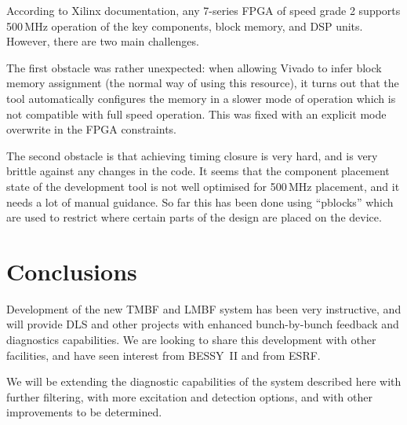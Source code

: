 \documentclass[
    a4paper,
    keeplastbox,            %
    hyphens,                %
    nospread,               %
]{jacow-2_1}
\begin{document}
According to Xilinx documentation, any 7-series FPGA of speed grade 2 supports
500\,MHz operation of the key components, block memory, and DSP units.  However,
there are two main challenges.

The first obstacle was rather unexpected: when allowing Vivado to infer block
memory assignment (the normal way of using this resource), it turns out that the
tool automatically configures the memory in a slower mode of operation which is
not compatible with full speed operation.  This was fixed with an explicit mode
overwrite in the FPGA constraints.

The second obstacle is that achieving timing closure is very hard, and is very
brittle against any changes in the code.  It seems that the component placement
state of the development tool is not well optimised for 500\,MHz placement, and
it needs a lot of manual guidance.  So far this has been done using ``pblocks''
which are used to restrict where certain parts of the design are placed on the
device.


\section{Conclusions}

Development of the new TMBF and LMBF system has been very instructive, and will
provide DLS and other projects with enhanced bunch-by-bunch feedback and
diagnostics capabilities.  We are looking to share this development with other
facilities, and have seen interest from BESSY~II and from ESRF.

We will be extending the diagnostic capabilities of the system described here
with further filtering, with more excitation and detection options, and with
other improvements to be determined.
\end{document}
